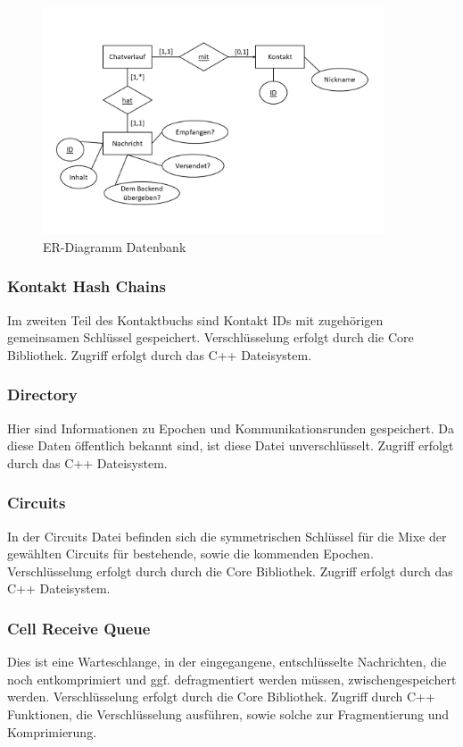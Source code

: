 \begin{figure}[h]
  \centering
     \includegraphics[width=0.9\textwidth]{diagramme/db.png}
  \caption{ER-Diagramm Datenbank}
  \label{fig:Bild8}
\end{figure}


\subsubsection{Kontakt Hash Chains}
\label{Kap2_3_2}
Im zweiten Teil des Kontaktbuchs sind Kontakt IDs mit zugehörigen gemeinsamen Schlüssel gespeichert.
Verschlüsselung erfolgt durch die Core Bibliothek.
Zugriff erfolgt durch das C++ Dateisystem.

\subsubsection{Directory}
Hier sind Informationen zu Epochen und Kommunikationsrunden gespeichert.
Da diese Daten öffentlich bekannt sind, ist diese Datei unverschlüsselt.
Zugriff erfolgt durch das C++ Dateisystem.

\subsubsection{Circuits}
In der Circuits Datei befinden sich die symmetrischen Schlüssel für die Mixe der gewählten Circuits für bestehende, sowie die kommenden Epochen.
Verschlüsselung erfolgt durch durch die Core Bibliothek.
Zugriff erfolgt durch das C++ Dateisystem.

\subsubsection{Cell Receive Queue}
\label{Kap2_3_6}
Dies ist eine Warteschlange, in der eingegangene, entschlüsselte Nachrichten, die noch entkomprimiert und ggf. defragmentiert werden müssen, zwischengespeichert werden.
Verschlüsselung erfolgt durch die Core Bibliothek.
Zugriff durch C++ Funktionen, die Verschlüsselung ausführen, sowie solche zur Fragmentierung und Komprimierung.

